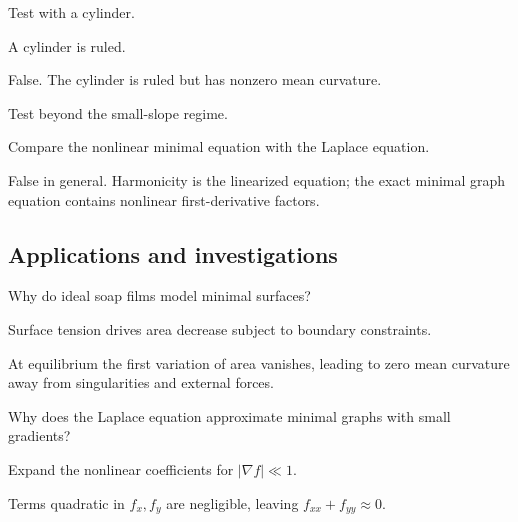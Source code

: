 \begin{exercise}\label{exr:vii19-ped-11}
Test with a cylinder.
\end{exercise}
\begin{hint}
A cylinder is ruled.
\end{hint}
\begin{solution}
False.  The cylinder is ruled but has nonzero mean curvature.
\end{solution}

\begin{exercise}\label{exr:vii19-ped-12}
Test beyond the small-slope regime.
\end{exercise}
\begin{hint}
Compare the nonlinear minimal equation with the Laplace equation.
\end{hint}
\begin{solution}
False in general.  Harmonicity is the linearized equation; the exact minimal graph equation contains nonlinear first-derivative factors.
\end{solution}

\subsection*{Applications and investigations}

\begin{exercise}\label{exr:vii19-ped-13}
Why do ideal soap films model minimal surfaces?
\end{exercise}
\begin{hint}
Surface tension drives area decrease subject to boundary constraints.
\end{hint}
\begin{solution}
At equilibrium the first variation of area vanishes, leading to zero mean curvature away from singularities and external forces.
\end{solution}

\begin{exercise}\label{exr:vii19-ped-14}
Why does the Laplace equation approximate minimal graphs with small gradients?
\end{exercise}
\begin{hint}
Expand the nonlinear coefficients for \(|\nabla f|\ll1\).
\end{hint}
\begin{solution}
Terms quadratic in \(f_x,f_y\) are negligible, leaving \(f_{xx}+f_{yy}\approx0\).
\end{solution}


